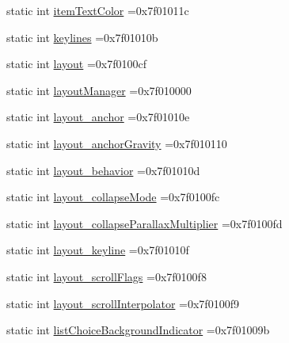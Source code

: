 \begin{DoxyCompactItemize}
\item 
static int \hyperlink{classandroid_1_1support_1_1v7_1_1mediarouter_1_1R_1_1attr_afe2ce20b1e376096dd7cf27f1bda4df5}{item\+Text\+Color} =0x7f01011c
\item 
static int \hyperlink{classandroid_1_1support_1_1v7_1_1mediarouter_1_1R_1_1attr_a53b6bbac28b9bdef73522b0d16a6a6dc}{keylines} =0x7f01010b
\item 
static int \hyperlink{classandroid_1_1support_1_1v7_1_1mediarouter_1_1R_1_1attr_a7936d1b6f472a1418ca17e8942f5f989}{layout} =0x7f0100cf
\item 
static int \hyperlink{classandroid_1_1support_1_1v7_1_1mediarouter_1_1R_1_1attr_addc0eec1b634e205b041747ea0e287ee}{layout\+Manager} =0x7f010000
\item 
static int \hyperlink{classandroid_1_1support_1_1v7_1_1mediarouter_1_1R_1_1attr_af69c1f64204816025b4664fd0a292592}{layout\+\_\+anchor} =0x7f01010e
\item 
static int \hyperlink{classandroid_1_1support_1_1v7_1_1mediarouter_1_1R_1_1attr_a9aed551fd040263a028c9e8fa00edde7}{layout\+\_\+anchor\+Gravity} =0x7f010110
\item 
static int \hyperlink{classandroid_1_1support_1_1v7_1_1mediarouter_1_1R_1_1attr_af01a26bb13f9e082ad8d1eec85df0fde}{layout\+\_\+behavior} =0x7f01010d
\item 
static int \hyperlink{classandroid_1_1support_1_1v7_1_1mediarouter_1_1R_1_1attr_a44d7e27bf5d67c11cc613491cfb7865c}{layout\+\_\+collapse\+Mode} =0x7f0100fc
\item 
static int \hyperlink{classandroid_1_1support_1_1v7_1_1mediarouter_1_1R_1_1attr_afb850e29005e17531a195a97798099f2}{layout\+\_\+collapse\+Parallax\+Multiplier} =0x7f0100fd
\item 
static int \hyperlink{classandroid_1_1support_1_1v7_1_1mediarouter_1_1R_1_1attr_a263dd8823e9a80e9dd8ef0b863310f9b}{layout\+\_\+keyline} =0x7f01010f
\item 
static int \hyperlink{classandroid_1_1support_1_1v7_1_1mediarouter_1_1R_1_1attr_a7ffb7431db8067b52ba477cf40366447}{layout\+\_\+scroll\+Flags} =0x7f0100f8
\item 
static int \hyperlink{classandroid_1_1support_1_1v7_1_1mediarouter_1_1R_1_1attr_afb1d27cde9e0adc7649345bdf80cdb15}{layout\+\_\+scroll\+Interpolator} =0x7f0100f9
\item 
static int \hyperlink{classandroid_1_1support_1_1v7_1_1mediarouter_1_1R_1_1attr_a580e0b8b5fb7b57b904717752665ed0e}{list\+Choice\+Background\+Indicator} =0x7f01009b
\item 

\end{DoxyCompactItemize}

